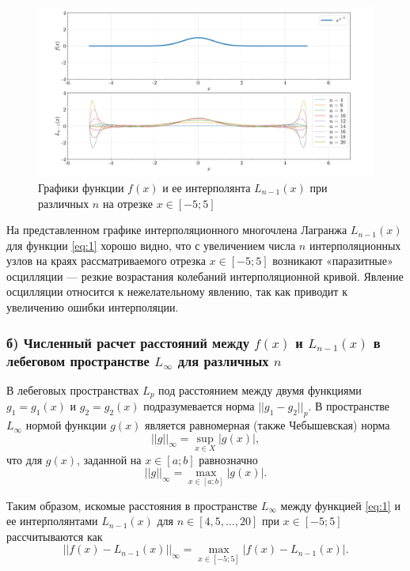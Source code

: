 \begin{figure}
    \centering
    \hspace*{-2em}\includegraphics[width=1.1\linewidth]{labs/f(x) + L_n-1.pdf}
    \caption{Графики функции $f(x)$ и ее интерполянта $L_{n-1}(x)$ при различных $n$ на отрезке $x \in [-5;5]$}
    \label{fig:fig2}
\end{figure}

На представленном графике интерполяционного многочлена Лагранжа $L_{n-1}(x)$ для функции \eqref{eq:1} хорошо видно, что с увеличением числа $n$ интерполяционных узлов на краях рассматриваемого отрезка $x \in [-5;5]$ возникают «паразитные» осцилляции — резкие возрастания колебаний интерполяционной кривой. Явление осцилляции относится к нежелательному явлению, так как приводит к увеличению ошибки интерполяции.
\pagebreak

\subsubsection{б) Численный расчет расстояний между $f(x)$ и $L_{n-1}(x)$ в лебеговом пространстве $L_{\infty}$ для различных $n$}
\label{z4b}

В лебеговых пространствах $L_p$ под расстоянием между двумя функциями $g_1 = g_1(x)$ и $g_2 = g_2(x)$ подразумевается норма $||g_1 - g_2||_p$. В пространстве $L_{\infty}$ нормой функции $g(x)$ является равномерная (также Чебышевская) норма
\begin{equation}
    ||g||_{\infty} = \sup_{x \in X}|g(x)|,
\end{equation}
что для $g(x)$, заданной на $x \in [a;b]$ равнозначно
\begin{equation}
    ||g||_{\infty} = \max_{x \in [a;b]}|g(x)|.
\end{equation}

Таким образом, искомые расстояния в пространстве $L_{\infty}$ между функцией \eqref{eq:1} и ее интерполянтами $L_{n-1}(x)$ для $n \in [4,5,...,20]$ при $x \in [-5;5]$ рассчитываются как
\begin{equation}
    ||f(x)-L_{n-1}(x)||_{\infty}=\max_{x \in [-5;5]}|f(x)-L_{n-1}(x)|.
\end{equation}

